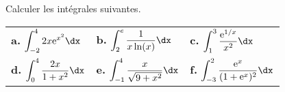 \documentclass[11pt,fleqn, openany]{book} %
\begin{document}
 \begin{exercise}[topic=int02]Calculer les intégrales suivantes.
 \renewcommand{\arraystretch}{2.5}
  \vspace{-0.5cm}
 \begin{center}
 \begin{tabularx}{\linewidth}{XXX}
 \textbf{a.} $\displaystyle\int_{-2}^4 2x\e^{x^2} \dx$ & \textbf{b.} $\displaystyle\int_{2}^{e} \dfrac{1}{x\ln(x)}\dx$ &
\textbf{c.} $\displaystyle\int_{1}^{3} \dfrac{\e^{1/x}}{x^2} \dx$ \\
\textbf{d.} $\displaystyle\int_{0}^{4} \dfrac{2x}{1+x^2} \dx$&
\textbf{e.} $\displaystyle\int_{-1}^{4} \dfrac{x}{\sqrt{9+x^2}} \dx$ & \textbf{f.} $\displaystyle\int_{-3}^2 \dfrac{\e^x}{(1+\e^x)^2}\dx$
 \end{tabularx}\end{center}\end{exercise}
 
\end{document}
